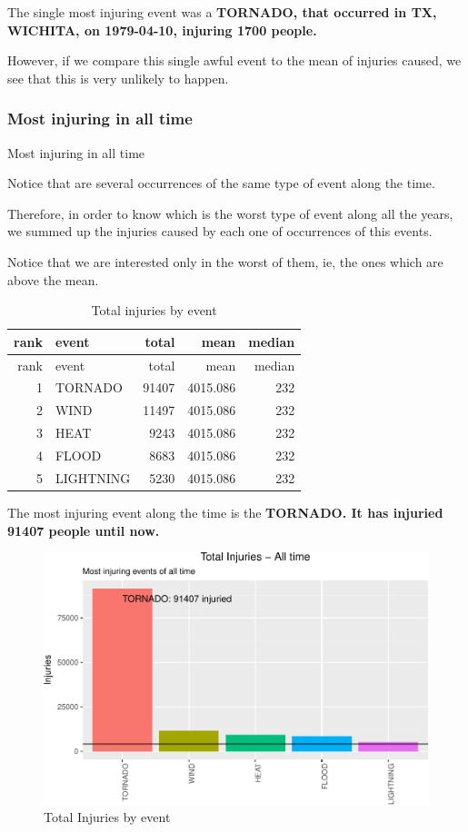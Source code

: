 \documentclass[]{article}
\begin{document}
The single most injuring event was a \textbf{TORNADO, that occurred in
TX, WICHITA, on 1979-04-10, injuring 1700 people.}

However, if we compare this single awful event to the mean of injuries
caused, we see that this is very unlikely to happen.

\subsubsection{Most injuring in all
time}\label{most-injuring-in-all-time}

Most injuring in all time

Notice that are several occurrences of the same type of event along the
time.

Therefore, in order to know which is the worst type of event along all
the years, we summed up the injuries caused by each one of occurrences
of this events.

Notice that we are interested only in the worst of them, ie, the ones
which are above the mean.

\begin{longtable}[]{@{}rlrrr@{}}
\caption{Total injuries by event}\tabularnewline
\toprule
rank & event & total & mean & median\tabularnewline
\midrule
\endfirsthead
\toprule
rank & event & total & mean & median\tabularnewline
\midrule
\endhead
1 & TORNADO & 91407 & 4015.086 & 232\tabularnewline
2 & WIND & 11497 & 4015.086 & 232\tabularnewline
3 & HEAT & 9243 & 4015.086 & 232\tabularnewline
4 & FLOOD & 8683 & 4015.086 & 232\tabularnewline
5 & LIGHTNING & 5230 & 4015.086 & 232\tabularnewline
\bottomrule
\end{longtable}

The most injuring event along the time is the \textbf{TORNADO. It has
injuried 91407 people until now.}

\begin{figure}[h!]
\centering
\includegraphics{readme_files/figure-latex/injuring-all-plot-1.pdf}
\caption{Total Injuries by event}
\end{figure}
\end{document}
